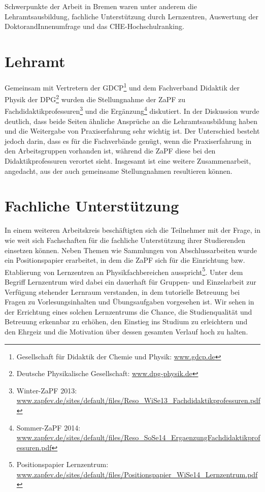 \documentclass{scrartcl}
\renewcommand{\headrulewidth}{0pt}
\begin{document}
Schwerpunkte der Arbeit in Bremen waren unter anderem die Lehramtsausbildung, fachliche Unterst\"utzung durch Lernzentren, Auswertung der DoktorandInnenumfrage und das CHE-Hochschulranking.

\pagebreak
\renewcommand{\headrulewidth}{0.1pt}
\rhead{\thepage}

\section*{Lehramt}
Gemeinsam mit Vertretern der GDCP\footnote{Gesellschaft f\"ur Didaktik der Chemie und Physik: \href{http://www.gdcp.de}{\url{www.gdcp.de}}} und dem Fachverband Didaktik der Physik der DPG\footnote{Deutsche Physikalische Gesellschaft: \href{http://www.dpg-physik.de}{\url{www.dpg-physik.de}}} wurden die Stellungnahme der ZaPF zu Fachdidaktikprofessuren\footnote{Winter-ZaPF 2013: \href{http://zapfev.de/sites/default/files/Reso_WiSe13_Fachdidaktikprofessuren.pdf}{\url{www.zapfev.de/sites/default/files/Reso_WiSe13_Fachdidaktikprofessuren.pdf}}} und die Ergänzung\footnote{Sommer-ZaPF 2014: \href{http://zapfev.de/sites/default/files/Reso_SoSe14_ErgaenzungFachdidaktikprofessuren.pdf}{\url{www.zapfev.de/sites/default/files/Reso_SoSe14_ErgaenzungFachdidaktikprofessuren.pdf}}} diskutiert. In der Diskussion wurde deutlich, dass beide Seiten ähnliche Ansprüche an die Lehramtsausbildung haben und die Weitergabe von Praxiserfahrung sehr wichtig ist. Der Unterschied besteht jedoch darin, dass es für die Fachverbände genügt, wenn die Praxiserfahrung in den Arbeitsgruppen vorhanden ist, während die ZaPF diese bei den Didaktikprofessuren verortet sieht. Insgesamt ist eine weitere Zusammenarbeit, angedacht, aus der auch gemeinsame Stellungnahmen resultieren können.

\section*{Fachliche Unterstützung}
In einem weiteren Arbeitskreis beschäftigten sich die Teilnehmer mit der Frage, in wie weit sich Fachschaften für die fachliche Unterstützung ihrer Studierenden einsetzen können. 
Neben Themen wie Sammlungen von Abschlussarbeiten wurde ein Positionspapier erarbeitet, in dem die ZaPF sich für die Einrichtung bzw. Etablierung von Lernzentren an Physikfachbereichen ausspricht\footnote{Positionspapier Lernzentrum: \href{www.zapfev.de/sites/default/files/Positionspapier_WiSe14_Lernzentrum.pdf}{\url{www.zapfev.de/sites/default/files/Positionspapier_WiSe14_Lernzentrum.pdf}}}. Unter dem Begriff Lernzentrum wird dabei ein dauerhaft für Gruppen- und Einzelarbeit zur Verfügung stehender Lernraum verstanden, in dem tutorielle Betreuung bei Fragen zu Vorlesungsinhalten und Übungsaufgaben vorgesehen ist. Wir sehen in der Errichtung eines solchen Lernzentrums die Chance, die Studienqualität und Betreuung erkennbar zu erhöhen, den Einstieg ins Studium zu erleichtern und den Ehrgeiz und die Motivation über dessen gesamten Verlauf hoch zu halten.
\end{document}
